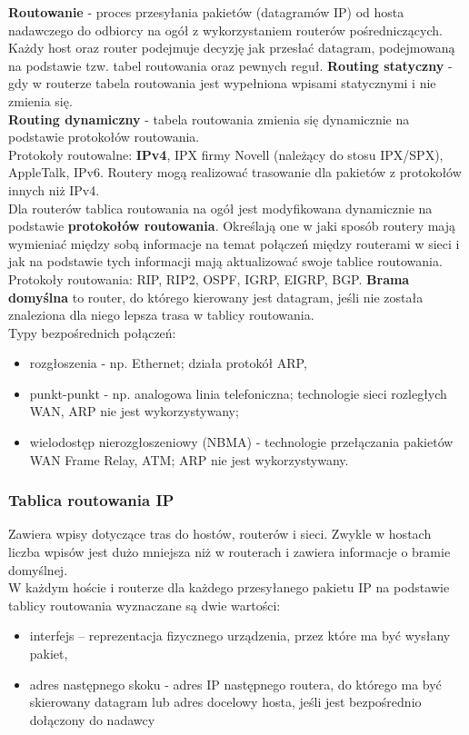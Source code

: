 \documentclass[../main.tex]{subfiles}
\begin{document}
    \textbf{Routowanie} - proces przesyłania pakietów (datagramów IP) od hosta nadawczego do
    odbiorcy na ogół z wykorzystaniem routerów pośredniczących. Każdy host oraz router podejmuje decyzję jak przesłać datagram, podejmowaną na podstawie tzw. tabel routowania oraz pewnych reguł.
    \textbf{Routing statyczny} - gdy w routerze tabela routowania jest wypełniona wpisami statycznymi i nie zmienia się.\\
    \textbf{Routing dynamiczny} - tabela routowania zmienia się dynamicznie na podstawie protokołów routowania.\\
    Protokoły routowalne: \textbf{IPv4}, IPX firmy Novell (należący do stosu IPX/SPX), AppleTalk, IPv6. Routery mogą realizować trasowanie dla pakietów z
    protokołów innych niż IPv4.\\
    Dla routerów tablica routowania na ogół jest modyfikowana dynamicznie na podstawie \textbf{protokołów routowania}. Określają one w jaki sposób routery mają wymieniać między sobą informacje na temat połączeń między routerami w sieci i jak na podstawie tych informacji mają aktualizować swoje tablice routowania.\\
    Protokoły routowania: RIP, RIP2, OSPF, IGRP, EIGRP, BGP.
    \textbf{Brama domyślna} to router, do którego kierowany jest datagram, jeśli nie została znaleziona dla niego lepsza trasa w tablicy routowania.\\

    Typy bezpośrednich połączeń:
    \begin{itemize}
        \item rozgłoszenia - np. Ethernet; działa protokół ARP,
        \item punkt-punkt - np. analogowa linia telefoniczna; technologie sieci rozległych WAN, ARP nie jest wykorzystywany;
        \item wielodostęp nierozgłoszeniowy (NBMA) -  technologie przełączania pakietów WAN Frame Relay, ATM; ARP nie jest wykorzystywany.
    \end{itemize}

    \subsubsection{Tablica routowania IP}
    Zawiera wpisy dotyczące tras do hostów, routerów i sieci. Zwykle w
    hostach liczba wpisów jest dużo mniejsza niż w routerach i zawiera informacje o bramie domyślnej.\\

    W każdym hoście i routerze dla każdego przesyłanego pakietu IP na podstawie tablicy
    routowania wyznaczane są dwie wartości:
    \begin{itemize}
        \item interfejs – reprezentacja fizycznego urządzenia, przez które ma być wysłany pakiet,
        \item adres następnego skoku - adres IP następnego routera, do którego ma być skierowany datagram lub adres
        docelowy hosta, jeśli jest bezpośrednio dołączony do nadawcy\
\end{itemize}
\end{document}
